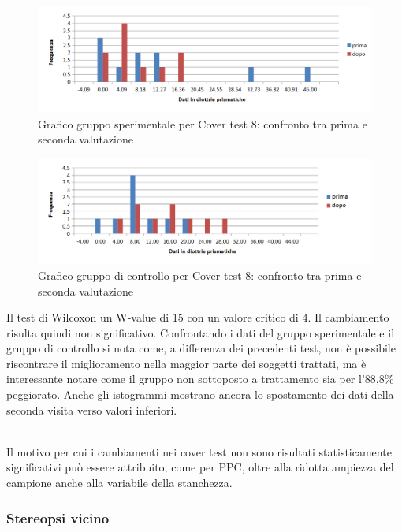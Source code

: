  \begin{figure}[h!]
	\centering
	\includegraphics[scale=0.8]{source/grafici/cover_test_8_trattati_nuovo.png}
	\caption[figure]{Grafico gruppo sperimentale per Cover test 8: confronto tra prima e seconda valutazione}
	\label{fig:issuexample}
\end{figure}
 \begin{figure}[h!]
	\centering
	\includegraphics[scale=0.8]{source/grafici/cover_test_8_giustissimo_non_trattati.png}
	\caption[figure]{Grafico gruppo di controllo per Cover test 8: confronto tra prima e seconda valutazione}
	\label{fig:issuexample}
\end{figure}

Il test di Wilcoxon un W-value di 15 con un valore critico di 4. Il cambiamento risulta quindi non significativo. Confrontando i dati del gruppo sperimentale e il gruppo di controllo si nota come, a differenza dei precedenti test, non è possibile riscontrare il miglioramento nella maggior parte dei soggetti trattati, ma è interessante notare come il gruppo non sottoposto a trattamento sia per l’88,8\% peggiorato. Anche gli istogrammi mostrano ancora lo spostamento dei dati della seconda visita verso valori inferiori. 
\\\

Il motivo per cui i cambiamenti nei cover test non sono risultati statisticamente significativi può essere attribuito, come per PPC, oltre alla ridotta ampiezza del campione anche alla variabile della stanchezza.


\subsubsection{Stereopsi vicino}

